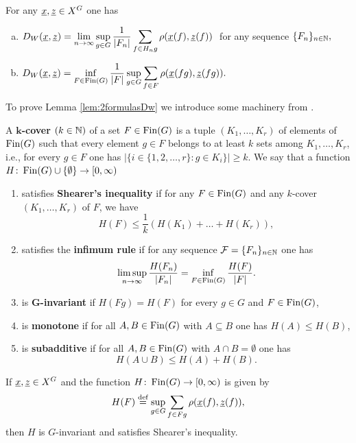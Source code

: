 \begin{lem}\label{lem:2formulasDw}
For any $\underline{x}, \underline{z}\in X^G$ one has
\begin{enumerate}[a)]
\item $\displaystyle D_W(\underline{x}, \underline{z})=\lim_{n\to\infty}\sup_{g\in G}\frac{1}{|F_n|}\sum_{f\in H_ng}\rho(\underline{x}(f),\underline{z}(f))$\,\, for any \Folner sequence $\{F_n\}_{n\in\mathbb{N}},$
\item $\displaystyle D_W(\underline{x}, \underline{z})=\inf_{F\in\operatorname{Fin}(G)}\frac{1}{|F|}\sup_{g\in G}\sum_{f\in F}\rho(\underline{x}(fg), \underline{z}(fg)).$
\end{enumerate}
\end{lem}

\noindent
To prove Lemma \ref{lem:2formulasDw} we introduce some machinery from \cite{DFR16}.
\medskip

A {\bf $\bm{k}$-cover} $(k\in\mathbb{N})$ of a set $F\in \operatorname{Fin}(G)$ is a tuple $(K_1,\ldots,K_r)$ of elements of $\operatorname{Fin}(G)$ such that every element $g\in F$ belongs to at least $k$ sets among $K_1,\ldots,K_r$, i.e., for every $g\in F$ one has $|\{ i\in\{1,2,\ldots,r\}: g\in K_i\}|\geq k$.
We say that a function $H\colon\operatorname{Fin}(G)\cup\{\emptyset\} \to [0,\infty)$
\begin{enumerate}
\item satisfies {\bf Shearer's inequality} if for any $F\in \operatorname{Fin}(G)$ and any $k$-cover $(K_1,\ldots,K_r)$ of $F$, we have
\[H(F) \leq \frac{1}{k} ( H(K_1)+\ldots + H(K_r)),\]
\item satisfies the {\bf infimum rule} if for any \Folner sequence $\mathcal F=\{F_n\}_{n\in\mathbb{N}}$ one has
\[
\limsup_{n\to\infty} \frac{H(F_n)}{|F_n|} = \inf_{F\in \operatorname{Fin}(G)} \frac{ H(F)}{|F|}.
\]
\item  is {\bf $\bm{G}$-invariant} if $H(Fg) = H(F)$ for every $g\in G$ and $F\in \operatorname{Fin}(G)$,
\item is {\bf monotone} if for all $A, B\in \operatorname{Fin}(G)$ with $A\subseteq B$ one has $H(A)\leq H(B)$,
\item is {\bf subadditive} if for all $A, B\in \operatorname{Fin}(G)$ with $A\cap B=\emptyset$ one has \[H(A\cup B)\leq H(A)+H(B).\]
\end{enumerate}

\begin{lem}\label{InfShearer}
If $\underline{x},\underline{z} \in X^G$ and the function $H\colon \operatorname{Fin}(G) \to [0,\infty)$ is given by 
\[
H(F) \stackrel{\textup{def}}{=} \sup_{g \in G} \sum_{f\in Fg} \rho (\underline{x}(f),\underline{z}(f)),
\]
then $H$ is $G$-invariant and satisfies Shearer's inequality. 
\end{lem}

